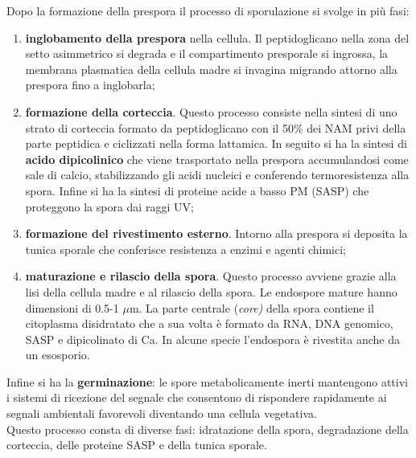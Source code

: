 \documentclass[11pt]{book}
\begin{document}
\vspace{1em}
Dopo la formazione della prespora il processo di sporulazione si svolge in più fasi:
\begin{enumerate}
\item \textbf{inglobamento della prespora} nella cellula. Il peptidoglicano nella zona del setto asimmetrico si degrada e il compartimento presporale si ingrossa, la membrana plasmatica della cellula madre si invagina migrando attorno alla prespora fino a inglobarla;
\item \textbf{formazione della corteccia}. Questo processo consiste nella sintesi di uno strato di corteccia formato da peptidoglicano con il 50$\%$  dei NAM privi della parte peptidica e ciclizzati nella forma lattamica. In seguito si ha la sintesi di \textbf{acido dipicolinico} che viene trasportato nella prespora accumulandosi come sale di calcio, stabilizzando gli acidi nucleici e conferendo termoresistenza alla spora. Infine si ha la sintesi di proteine acide a basso PM (SASP) che proteggono la spora dai raggi UV;
\item \textbf{formazione del rivestimento esterno}. Intorno alla prespora si deposita la tunica sporale che conferisce resistenza a enzimi e agenti chimici;
\item \textbf{maturazione e rilascio della spora}. Questo processo avviene grazie alla lisi della cellula madre e al rilascio della spora. Le endospore mature hanno dimensioni di 0.5-1 $\mu$m. La parte centrale (\emph{core)} della spora contiene il citoplasma disidratato che a sua volta è formato da RNA, DNA genomico, SASP e dipicolinato di Ca. In alcune specie l’endospora è rivestita anche da un esosporio.
\end{enumerate}

\clearpage
Infine si ha la \textbf{germinazione}: le spore metabolicamente inerti mantengono attivi i sistemi di ricezione del segnale che consentono di rispondere rapidamente ai segnali ambientali favorevoli diventando una cellula vegetativa.\\
Questo processo consta di diverse fasi: idratazione della spora, degradazione della corteccia, delle proteine SASP e della tunica sporale.
\end{document}
